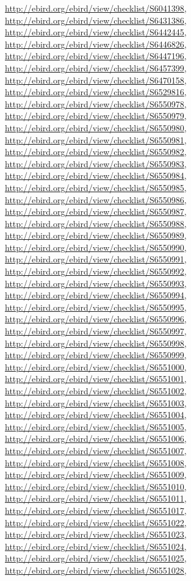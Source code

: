 \documentclass[9pt, article]{memoir}
\begin{document}
\begin{multicols}{2}
\url{http://ebird.org/ebird/view/checklist/S6041398}, 
\url{http://ebird.org/ebird/view/checklist/S6431386}, 
\url{http://ebird.org/ebird/view/checklist/S6442445}, 
\url{http://ebird.org/ebird/view/checklist/S6446826}, 
\url{http://ebird.org/ebird/view/checklist/S6447196}, 
\url{http://ebird.org/ebird/view/checklist/S6457399}, 
\url{http://ebird.org/ebird/view/checklist/S6470158}, 
\url{http://ebird.org/ebird/view/checklist/S6529816}, 
\url{http://ebird.org/ebird/view/checklist/S6550978}, 
\url{http://ebird.org/ebird/view/checklist/S6550979}, 
\url{http://ebird.org/ebird/view/checklist/S6550980}, 
\url{http://ebird.org/ebird/view/checklist/S6550981}, 
\url{http://ebird.org/ebird/view/checklist/S6550982}, 
\url{http://ebird.org/ebird/view/checklist/S6550983}, 
\url{http://ebird.org/ebird/view/checklist/S6550984}, 
\url{http://ebird.org/ebird/view/checklist/S6550985}, 
\url{http://ebird.org/ebird/view/checklist/S6550986}, 
\url{http://ebird.org/ebird/view/checklist/S6550987}, 
\url{http://ebird.org/ebird/view/checklist/S6550988}, 
\url{http://ebird.org/ebird/view/checklist/S6550989}, 
\url{http://ebird.org/ebird/view/checklist/S6550990}, 
\url{http://ebird.org/ebird/view/checklist/S6550991}, 
\url{http://ebird.org/ebird/view/checklist/S6550992}, 
\url{http://ebird.org/ebird/view/checklist/S6550993}, 
\url{http://ebird.org/ebird/view/checklist/S6550994}, 
\url{http://ebird.org/ebird/view/checklist/S6550995}, 
\url{http://ebird.org/ebird/view/checklist/S6550996}, 
\url{http://ebird.org/ebird/view/checklist/S6550997}, 
\url{http://ebird.org/ebird/view/checklist/S6550998}, 
\url{http://ebird.org/ebird/view/checklist/S6550999}, 
\url{http://ebird.org/ebird/view/checklist/S6551000}, 
\url{http://ebird.org/ebird/view/checklist/S6551001}, 
\url{http://ebird.org/ebird/view/checklist/S6551002}, 
\url{http://ebird.org/ebird/view/checklist/S6551003}, 
\url{http://ebird.org/ebird/view/checklist/S6551004}, 
\url{http://ebird.org/ebird/view/checklist/S6551005}, 
\url{http://ebird.org/ebird/view/checklist/S6551006}, 
\url{http://ebird.org/ebird/view/checklist/S6551007}, 
\url{http://ebird.org/ebird/view/checklist/S6551008}, 
\url{http://ebird.org/ebird/view/checklist/S6551009}, 
\url{http://ebird.org/ebird/view/checklist/S6551010}, 
\url{http://ebird.org/ebird/view/checklist/S6551011}, 
\url{http://ebird.org/ebird/view/checklist/S6551017}, 
\url{http://ebird.org/ebird/view/checklist/S6551022}, 
\url{http://ebird.org/ebird/view/checklist/S6551023}, 
\url{http://ebird.org/ebird/view/checklist/S6551024}, 
\url{http://ebird.org/ebird/view/checklist/S6551025}, 
\url{http://ebird.org/ebird/view/checklist/S6551028}, 

\end{multicols}
\end{document}
